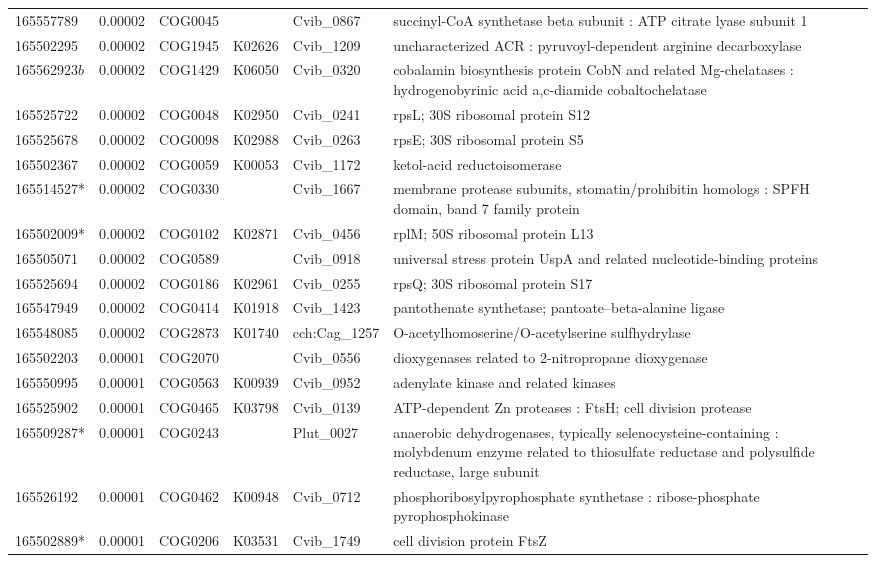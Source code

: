 \begin{landscape}
\begin{longtable}{p{1.6cm}p{1.2cm}p{1.5cm}p{1.5cm}p{2.8cm}p{13.5cm}}
165557789&0.00002&COG0045&&Cvib\_0867&succinyl-CoA synthetase beta subunit : ATP citrate lyase subunit 1 \\
165502295&0.00002&COG1945&K02626&Cvib\_1209&uncharacterized ACR : pyruvoyl-dependent arginine decarboxylase \\
165562923$b$&0.00002&COG1429&K06050&Cvib\_0320&cobalamin biosynthesis protein CobN and related Mg-chelatases : hydrogenobyrinic acid a,c-diamide cobaltochelatase \\
165525722&0.00002&COG0048&K02950&Cvib\_0241&rpsL; 30S ribosomal protein S12 \\
165525678&0.00002&COG0098&K02988&Cvib\_0263&rpsE; 30S ribosomal protein S5 \\
165502367&0.00002&COG0059&K00053&Cvib\_1172&ketol-acid reductoisomerase \\
165514527*&0.00002&COG0330&&Cvib\_1667&membrane protease subunits, stomatin/prohibitin homologs : SPFH domain, band 7 family protein \\
165502009*&0.00002&COG0102&K02871&Cvib\_0456&rplM; 50S ribosomal protein L13 \\
165505071&0.00002&COG0589&&Cvib\_0918&universal stress protein UspA and related nucleotide-binding proteins \\
165525694&0.00002&COG0186&K02961&Cvib\_0255&rpsQ; 30S ribosomal protein S17 \\
165547949&0.00002&COG0414&K01918&Cvib\_1423&pantothenate synthetase; pantoate--beta-alanine ligase \\
165548085&0.00002&COG2873&K01740&cch:Cag\_1257&O-acetylhomoserine/O-acetylserine sulfhydrylase \\
165502203&0.00001&COG2070&&Cvib\_0556&dioxygenases related to 2-nitropropane dioxygenase \\
165550995&0.00001&COG0563&K00939&Cvib\_0952&adenylate kinase and related kinases \\
165525902&0.00001&COG0465&K03798&Cvib\_0139&ATP-dependent Zn proteases : FtsH; cell division protease \\
165509287*&0.00001&COG0243&&Plut\_0027&anaerobic dehydrogenases, typically selenocysteine-containing : molybdenum enzyme related to thiosulfate reductase and polysulfide reductase, large subunit \\
165526192&0.00001&COG0462&K00948&Cvib\_0712&phosphoribosylpyrophosphate synthetase : ribose-phosphate pyrophosphokinase \\
165502889*&0.00001&COG0206&K03531&Cvib\_1749&cell division protein FtsZ \\

\end{longtable}
\end{landscape}

